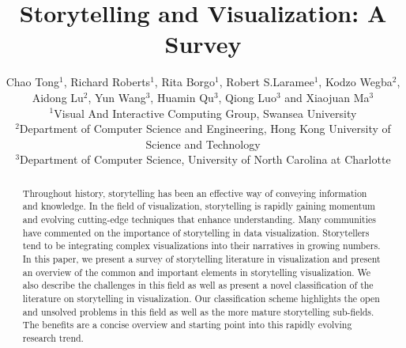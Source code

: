 \documentclass{egpubl}
\begin{document}
\title[Storytelling and Visualization: A Survey]%
      {Storytelling and Visualization: A Survey}

\author[C.Tong et al.]
       {Chao Tong$^{1}$, Richard Roberts$^{1}$, Rita Borgo$^{1}$, Robert S.Laramee$^{1}$,
        Kodzo Wegba$^{2}$, Aidong Lu$^{2}$,
        Yun Wang$^{3}$, Huamin Qu$^{3}$, Qiong Luo$^{3}$ and Xiaojuan Ma$^{3}$
        \\
         $^1$Visual And Interactive Computing Group, Swansea University\\
         $^2$Department of Computer Science and Engineering, Hong Kong University of Science and Technology\\
         $^3$Department of Computer Science, University of North Carolina at Charlotte\\
       }
\maketitle
\begin{abstract}
Throughout history, storytelling has been an effective way of conveying information and knowledge. In the field of visualization, storytelling is rapidly gaining momentum and evolving cutting-edge techniques that enhance understanding. Many communities have commented on the importance of storytelling in data visualization. Storytellers tend to be integrating complex visualizations into their narratives in growing numbers. In this paper, we present a survey of storytelling literature in visualization and present an overview of the common and important elements in storytelling visualization. We also describe the challenges in this field as well as present a novel classification of the literature on storytelling in visualization. Our classification scheme highlights the open and unsolved problems in this field as well as the more mature storytelling sub-fields. The benefits are a concise overview and starting point into this rapidly evolving research trend.
\end{abstract}
\end{document}
